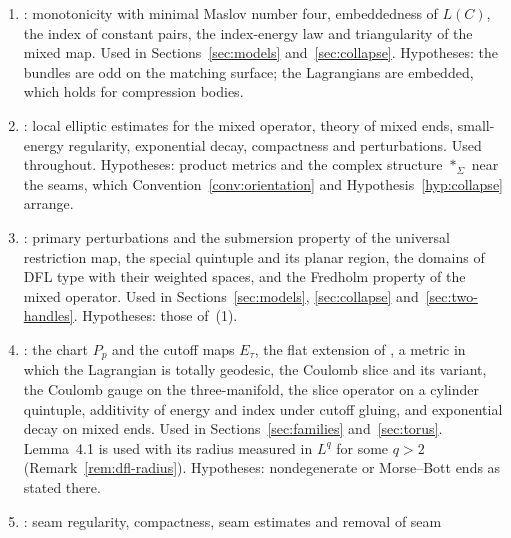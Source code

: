 \documentclass[11pt]{amsart}
\theoremstyle{definition}
\theoremstyle{remark}
\theoremstyle{plain}
\numberwithin{equation}{section}
\begin{document}
\begin{enumerate}[label=(\arabic*),leftmargin=2em]
\item \cite[Theorem~1, Propositions~2.21, 3.19, 3.20, Lemma~3.15,
  Theorem~3.29]{DFL}: monotonicity with minimal Maslov number four,
  embeddedness of $L(C)$, the index of constant pairs, the index-energy
  law and triangularity of the mixed map. Used in
  Sections~\ref{sec:models} and~\ref{sec:collapse}. Hypotheses: the
  bundles are odd on the matching surface; the Lagrangians are embedded,
  which holds for compression bodies.
\item \cite[Theorem~4.17, Remark~4.19, Section~4.2.1, (4.20)--(4.24),
  Theorem~5.2, Lemma~5.23, Proposition~5.29, Section~5.4, Section~6]{DFL}:
  local elliptic estimates for the mixed operator, theory of mixed ends,
  small-energy regularity, exponential decay, compactness and
  perturbations. Used throughout. Hypotheses: product metrics and the complex structure $*_\Sigma$ near the seams, which Convention~\ref{conv:orientation}
  and Hypothesis~\ref{hyp:collapse} arrange.
\item \cite[Section~2.3, Proposition~2.53, Section~3.1 and Figure~1, Definitions~3.8--3.9,
  (3.24), Proposition~3.18]{DFL}: primary perturbations and the submersion property of
  the universal restriction map, the special quintuple and its planar region, the
  domains of DFL type with their weighted spaces, and the Fredholm property of the
  mixed operator. Used in Sections~\ref{sec:models}, \ref{sec:collapse}
  and~\ref{sec:two-handles}. Hypotheses: those of~(1).
\item \cite[Section~4.1 with (4.3), (4.5), (4.7), (4.8), Lemmas~4.1, 4.2 and~4.4,
  Proposition~4.6, Section~4.2.1 with (4.16) and (4.24), Propositions~2.10, 4.65, 4.69,
  5.27, 5.28 and~5.29]{DFL}: the chart $P_p$ and the cutoff maps $E_\tau$, the flat
  extension of \cite[Lemma~4.2]{DFL}, a metric in which the Lagrangian is totally
  geodesic, the Coulomb slice and its variant, the Coulomb gauge on the three-manifold,
  the slice operator on a cylinder quintuple, additivity of energy and index under
  cutoff gluing, and exponential decay on mixed ends. Used in
  Sections~\ref{sec:families} and~\ref{sec:torus}. Lemma~4.1 is used with its radius
  measured in $L^q$ for some $q>2$ (Remark~\ref{rem:dfl-radius}). Hypotheses:
  nondegenerate or Morse--Bott ends as stated there.
\item \cite[Theorems~1 and~3, Theorem~4.2, Lemmas~4.25 and~4.50, Theorem~4.44]{DFL-mixed}:
  seam regularity, compactness, seam estimates and removal of seam

\end{enumerate}
\end{document}
